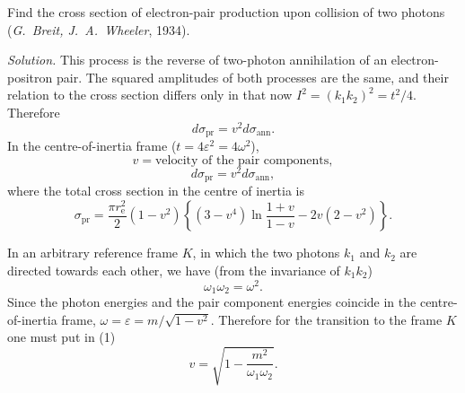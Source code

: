 Find the cross section of electron-pair production upon collision of two photons (\emph{G.~Breit, J.~A.~Wheeler}, 1934).

\emph{Solution.} This process is the reverse of two-photon annihilation of an electron-positron pair. The squared amplitudes of both processes are the same, and their relation to the cross section differs only in that now $I^2 = (k_1 k_2)^2 = t^2/4$. Therefore
\[
d\sigma_\text{pr} = v^2 d\sigma_\text{ann}.
\]
In the centre-of-inertia frame ($t = 4\varepsilon^2 = 4\omega^2$),
\[
v = \text{velocity of the pair components},
\]
\[
d\sigma_\text{pr} = v^2 d\sigma_\text{ann},
\]
where the total cross section in the centre of inertia is
\begin{equation}
\sigma_\text{pr} = \frac{\pi r_\mathrm{e}^2}{2}(1 - v^2)\left\{(3 - v^4)\ln\frac{1+v}{1-v} - 2v(2 - v^2)\right\}. \tag{1}
\end{equation}

In an arbitrary reference frame $K$, in which the two photons $k_1$ and $k_2$ are directed towards each other, we have (from the invariance of $k_1 k_2$)
\[
\omega_1\omega_2 = \omega^2.
\]
Since the photon energies and the pair component energies coincide in the centre-of-inertia frame, $\omega = \varepsilon = m/\sqrt{1 - v^2}$. Therefore for the transition to the frame $K$ one must put in (1)
\[
v = \sqrt{1 - \frac{m^2}{\omega_1\omega_2}}.
\]
\setcounter{equation}{15}
